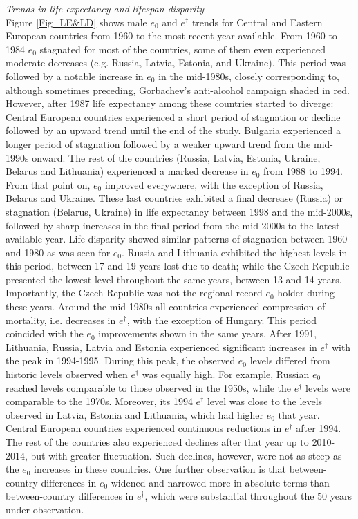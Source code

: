 \documentclass{article}
\begin{document}
\begin{spacing}{1.5}
\emph{Trends in life expectancy and lifespan disparity}\\

Figure \ref{Fig_LE&LD} shows male $e_0$ and $e^{\dagger}$ trends for Central and Eastern European countries from 1960 to the most recent year available. From 1960 to 1984 $e_0$ stagnated for most of the countries, some of them even experienced moderate decreases (e.g. Russia, Latvia, Estonia, and Ukraine). This period was followed by a notable increase in $e_0$ in the mid-1980s, closely corresponding to, although sometimes preceding, Gorbachev's anti-alcohol campaign shaded in red. However, after 1987 life expectancy among these countries started to diverge: Central European countries experienced a short period of stagnation or decline followed by an upward trend until the end of the study. Bulgaria experienced a longer period of stagnation followed by a weaker upward trend from the mid-1990s onward. The rest of the countries (Russia, Latvia, Estonia, Ukraine, Belarus and Lithuania) experienced a marked decrease in $e_0$ from 1988 to 1994. From that point on, $e_0$ improved everywhere, with the exception of Russia, Belarus and Ukraine. These last countries exhibited a final decrease (Russia) or stagnation (Belarus, Ukraine) in life expectancy between 1998 and the mid-2000s, followed by sharp increases in the final period from the mid-2000s to the latest available year. 
Life disparity showed similar patterns of stagnation between 1960 and 1980 as was seen for $e_0$. Russia and Lithuania exhibited the highest levels in this period, between 17 and 19 years lost due to death; while the Czech Republic presented the lowest level throughout the same years, between 13 and 14 years. Importantly, the Czech Republic was not the regional record $e_0$ holder during these years. Around the mid-1980s all countries experienced compression of mortality, i.e. decreases in $e^{\dagger}$, with the exception of Hungary. This period coincided with the $e_0$ improvements shown in the same years. After 1991, Lithuania, Russia, Latvia and Estonia experienced significant increases in $e^{\dagger}$ with the peak in 1994-1995. During this peak, the observed $e_0$ levels differed from historic levels observed when $e^{\dagger}$ was equally high. For example, Russian $e_0$ reached levels comparable to those observed in the 1950s, while the $e^{\dagger}$ levels were comparable to the 1970s. Moreover, its 1994 $e^{\dagger}$ level was close to the levels observed in Latvia, Estonia and Lithuania, which had higher $e_0$ that year. Central European countries experienced continuous reductions in $e^{\dagger}$ after 1994. The rest of the countries also experienced declines after that year up to 2010-2014, but with greater fluctuation. Such declines, however, were not as steep as the $e_0$ increases in these countries. 
One further observation is that between-country differences in $e_0$ widened and narrowed more in absolute terms than between-country differences in $e^{\dagger}$, which were substantial throughout the 50 years under observation. 



\end{spacing}
\end{document}
